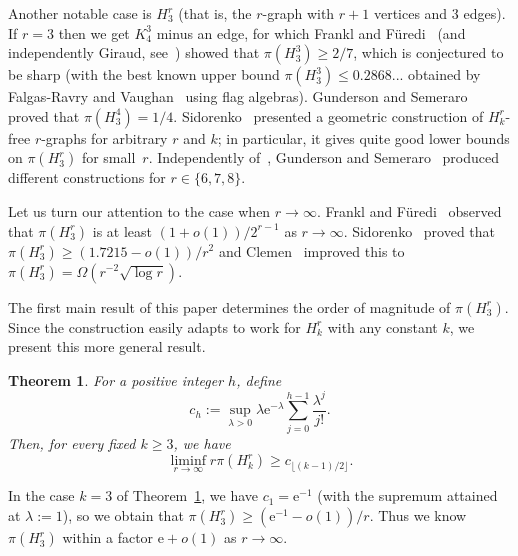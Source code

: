 \documentclass[10pt,a4paper]{article}
\numberwithin{equation}{section}
\newtheorem{theorem}{Theorem}[section]
\theoremstyle{definition}
\theoremstyle{remark}
\newcommand{\hide}[1]{{\color{DarkGreen}#1}}
\renewcommand{\hide}[1]{}
\newcommand{\me}{\mathrm{e}}
\begin{document}
Another notable case is $H_3^r$ (that is, the $r$-graph with $r+1$ vertices and 3 edges).  If $r=3$ then we get $K_4^3$ minus an edge, for which  Frankl and F\"uredi~\cite{FranklFuredi84} (and independently Giraud, see~\cite[Page 325]{FranklFuredi84}) showed that $\pi(H_3^3)\ge 2/7$, which is conjectured to be sharp (with the best known upper bound $\pi(H_3^3)\le 0.2868...$ obtained by Falgas-Ravry and Vaughan~\cite{FalgasVaughan13} using flag algebras). Gunderson and Semeraro~\cite{GundersonSemeraro17} proved that $\pi(H_3^4)=1/4$. Sidorenko~\cite{Sidorenko24} presented a geometric construction of $H_k^r$-free $r$-graphs for arbitrary $r$ and $k$; in particular, it gives quite good lower bounds on $\pi(H_3^r)$ for small~$r$. Independently of~\cite{Sidorenko24}, 
Gunderson and Semeraro~\cite[Theorem~1.1]{GundersonSemeraro25} produced different constructions for $r\in\{6,7,8\}$.
\hide{Gunderson and Semeraro~\cite{GundersonSemeraro25} proved $\pi(H_3^6)\ge 9/64$, $\pi(H_3^7)\ge 35/2^{11}$, and $\pi(H_3^8)\ge 315/2^{14}$.}

Let us turn our attention to the case when $r\to\infty$. Frankl and F\"uredi~\cite[Example~3]{FranklFuredi84} observed that $\pi(H_3^r)$ is at least $(1+o(1))/2^{r-1}$ as $r\to\infty$.
Sidorenko~\cite[Corollary 4.6]{Sidorenko24} proved that $\pi(H_3^r)\ge (1.7215-o(1))/r^{2}$ and Clemen~\cite[Theorem~1.2]{Clemen26} improved this to $\pi(H_3^r)= \Omega( r^{-2}\sqrt{\log r})$.

The first main result of this paper determines the order of magnitude of $\pi(H_3^r)$. Since the construction easily adapts to work for $H_k^r$ with any constant $k$, we present this more general result.

\begin{theorem}\label{thm:mainPoisson}
	For a positive integer $h$, define
	\begin{equation*}		c_h:=\sup_{\lambda>0}\lambda\me^{-\lambda}
		\sum_{j=0}^{h-1}\frac{\lambda^j}{j!}.
	\end{equation*}
	Then, for every fixed $k\ge3$, we have
	\begin{equation}\label{eq:poisson-fixed-bound}
		\liminf_{r\to\infty}r\pi(H_k^r)
		\ge c_{\lfloor(k-1)/2\rfloor}.
	\end{equation}
\end{theorem}


In the case $k=3$ of Theorem~\ref{thm:mainPoisson}, we have $c_1=\me^{-1}$ (with the supremum attained at $\lambda:=1$), so we obtain that $\pi(H_3^r)\ge (\me^{-1}-o(1))/r$. Thus we know $\pi(H_3^r)$ within a factor $\me+o(1)$ as $r\to\infty$.
\end{document}
